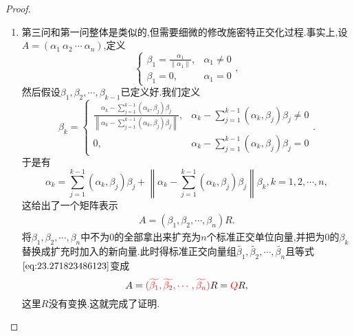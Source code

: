\documentclass[../../main.tex]{subfiles}
\begin{document}
\begin{proof}
\begin{enumerate}
\item 第三问和第一问整体是类似的,但需要细微的修改施密特正交化过程.事实上,设\( A = (\alpha_1\ \alpha_2\ \cdots\ \alpha_n) \),定义
\[
\begin{cases}
\beta_1 = \frac{\alpha_1}{\|\alpha_1\|}, & \alpha_1 \neq 0 \\
\beta_1 = 0, & \alpha_1 = 0
\end{cases},
\]
然后假设\( \beta_1, \beta_2, \cdots, \beta_{k - 1} \)已定义好.我们定义
\[
\beta_k = \begin{cases}
\frac{\alpha_k - \sum\limits_{j=1}^{k - 1} (\alpha_k, \beta_j) \beta_j}{\left\| \alpha_k - \sum\limits_{j=1}^{k - 1} (\alpha_k, \beta_j) \beta_j \right\|}, & \alpha_k - \sum_{j=1}^{k - 1} (\alpha_k, \beta_j) \beta_j \neq 0 \\
0, & \alpha_k - \sum_{j=1}^{k - 1} (\alpha_k, \beta_j) \beta_j = 0
\end{cases}.
\]
于是有
\[
\alpha_k = \sum_{j=1}^{k - 1} (\alpha_k, \beta_j) \beta_j + \left\| \alpha_k - \sum_{j=1}^{k - 1} (\alpha_k, \beta_j) \beta_j \right\| \beta_k, k = 1, 2, \cdots, n,
\]
这给出了一个矩阵表示
\begin{align}
A = (\beta_1, \beta_2, \cdots, \beta_n) R. \label{eq:23.271823486123}
\end{align}
将\( \beta_1, \beta_2, \cdots, \beta_n \)中不为0的全部拿出来扩充为\( n \)个标准正交单位向量,并把为0的\( \beta_k \)替换成扩充时加入的新向量.此时得标准正交向量组\( \widetilde{\beta_1}, \widetilde{\beta_2}, \cdots, \widetilde{\beta_n} \)且等式\(\eqref{eq:23.271823486123}\)变成
\[
A = {\color{red} (\widetilde{\beta_1}, \widetilde{\beta_2}, \cdots, \widetilde{\beta_n})} R = {\color{red} Q}R,
\]
这里\( R \)没有变换.这就完成了证明.
\end{enumerate}

\end{proof}
\end{document}
